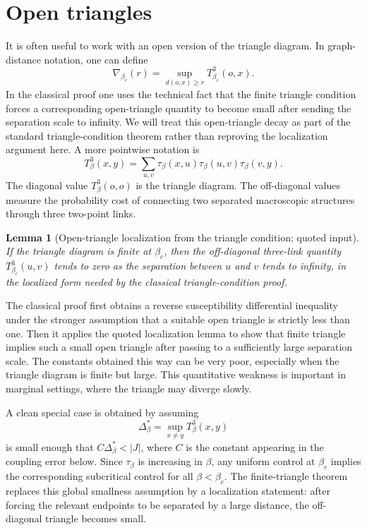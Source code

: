 \documentclass[11pt,reqno]{book}
\numberwithin{equation}{chapter}
\theoremstyle{plain}
\newtheorem{lemma}[theorem]{Lemma}
\theoremstyle{definition}
\theoremstyle{remark}
\newcommand{\1}{\mathbf 1}
\begin{document}
\section{Open triangles}

It is often useful to work with an open version of the triangle diagram. In graph-distance notation, one can define
\[
  \nabla_{\beta_c}(r)
  =
  \sup_{d(o,x)\geq r}T_{\beta_c}^3(o,x).
\]
In the classical proof one uses the technical fact that the finite triangle condition forces a corresponding open-triangle quantity to become small after sending the separation scale to infinity. We will treat this open-triangle decay as part of the standard triangle-condition theorem rather than reproving the localization argument here. A more pointwise notation is
\[
  T_\beta^3(x,y)
  =
  \sum_{u,v}\tau_\beta(x,u)\tau_\beta(u,v)\tau_\beta(v,y).
\]
The diagonal value $T_\beta^3(o,o)$ is the triangle diagram. The off-diagonal values measure the probability cost of connecting two separated macroscopic structures through three two-point links.

\begin{lemma}[Open-triangle localization from the triangle condition; quoted input]
If the triangle diagram is finite at \(\beta_c\), then the off-diagonal
three-link quantity \(T_{\beta_c}^3(u,v)\) tends to zero as the separation
between \(u\) and \(v\) tends to infinity, in the localized form needed by
the classical triangle-condition proof.
\end{lemma}

The classical proof first obtains a reverse susceptibility differential
inequality under the stronger assumption that a suitable open triangle is
strictly less than one. Then it applies the quoted localization lemma to show
that finite triangle implies such a small open triangle after passing to a
sufficiently large separation scale. The constants obtained this way can be
very poor, especially when the triangle diagram is finite but large. This
quantitative weakness is important in marginal settings, where the triangle
may diverge slowly.

A clean special case is obtained by assuming
\[
  \Delta_\beta^*=\sup_{x\neq y}T_\beta^3(x,y)
\]
is small enough that \(C\Delta_\beta^*<|J|\), where \(C\) is the constant appearing in the coupling error below. Since \(\tau_\beta\) is increasing in \(\beta\), any uniform control at \(\beta_c\) implies the corresponding subcritical control for all \(\beta<\beta_c\). The finite-triangle theorem replaces this global smallness assumption by a localization statement: after forcing the relevant endpoints to be separated by a large distance, the off-diagonal triangle becomes small.
\end{document}
